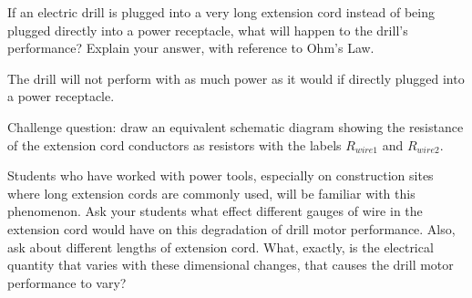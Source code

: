 

If an electric drill is plugged into a very long extension cord instead of being plugged directly into a power receptacle, what will happen to the drill's performance?  Explain your answer, with reference to Ohm's Law.







The drill will not perform with as much power as it would if directly plugged into a power receptacle.

\vskip 10pt

Challenge question: draw an equivalent schematic diagram showing the resistance of the extension cord conductors as resistors with the labels $R_{wire1}$ and $R_{wire2}$.







Students who have worked with power tools, especially on construction sites where long extension cords are commonly used, will be familiar with this phenomenon.  Ask your students what effect different gauges of wire in the extension cord would have on this degradation of drill motor performance.  Also, ask about different lengths of extension cord.  What, exactly, is the electrical quantity that varies with these dimensional changes, that causes the drill motor performance to vary?




